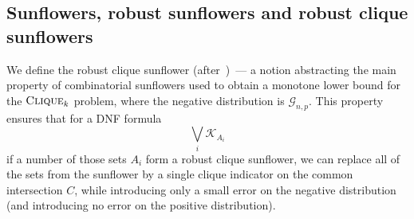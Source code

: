 \documentclass[10pt,a4paper]{article}
\newcommand{\cliquep}{\textsc{Clique}}
\begin{document}
\subsection{Sunflowers, robust sunflowers and robust clique sunflowers\label{sec:intro-sunflowers}}

We define the robust clique sunflower (after~\cite{cavalar2022})~--- a notion abstracting the main property of combinatorial sunflowers used to obtain a monotone lower bound for the $\cliquep_k$ problem, where the negative distribution is $\mathcal{G}_{n,p}$. This property ensures that for a DNF formula 
\begin{equation*}
    \bigvee_{i} \mathcal{K}_{A_i}
\end{equation*}
if a number of those sets $A_i$ form a robust clique sunflower, we can replace all of the sets from the sunflower by a single clique indicator on the common intersection $C$, while introducing only a small error on the negative distribution (and introducing no error on the positive distribution).
\end{document}
